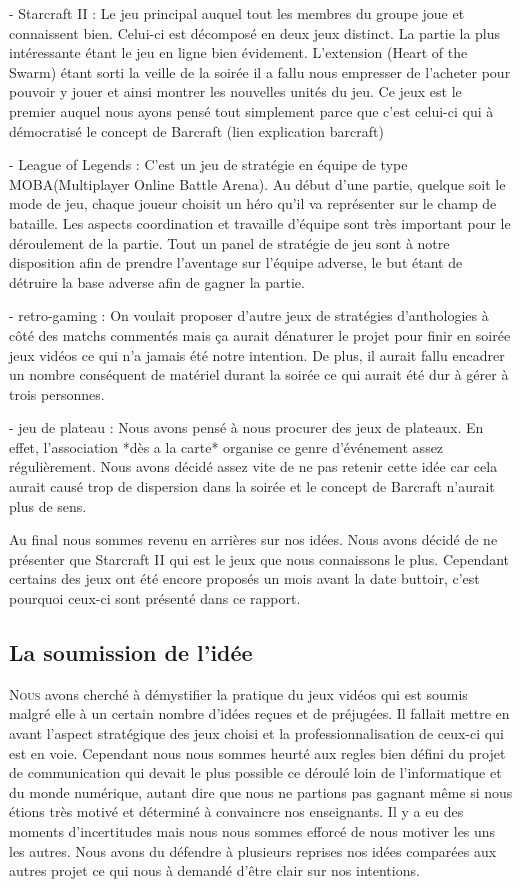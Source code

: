- Starcraft II : Le jeu principal auquel tout les membres du groupe joue
et connaissent bien. Celui-ci est décomposé en deux jeux distinct.  La
partie la plus intéressante étant le jeu en ligne bien évidement.
L'extension (Heart of the Swarm) étant sorti la veille de la soirée il a
fallu nous empresser de l'acheter pour pouvoir y jouer et ainsi montrer
les nouvelles unités du jeu. Ce jeux est le premier auquel nous ayons
pensé tout simplement parce que c'est celui-ci qui à démocratisé le
concept de Barcraft (lien explication barcraft)

- League of Legends : C'est un jeu de stratégie en équipe de type
MOBA(Multiplayer Online Battle Arena). Au début d'une partie, quelque soit
le mode de jeu, chaque joueur choisit un héro qu'il va représenter sur
le champ de bataille. Les aspects coordination et travaille d'équipe sont très
important pour le déroulement de la partie. Tout un panel de stratégie de jeu
sont à notre disposition afin de prendre l'aventage sur l'équipe adverse, le
but étant de détruire la base adverse afin de gagner la partie.

- retro-gaming : On voulait proposer d'autre jeux de stratégies
d'anthologies à côté des matchs commentés mais ça aurait dénaturer le
projet pour finir en soirée jeux vidéos ce qui n'a jamais été notre
intention. De plus, il aurait fallu encadrer un nombre conséquent de
matériel durant la soirée ce qui aurait été dur à gérer à trois
personnes.

- jeu de plateau : Nous avons pensé à nous procurer des jeux de
plateaux. En effet, l'association *dès a la carte* organise ce genre
d'événement assez régulièrement. Nous avons décidé assez vite de ne pas
retenir cette idée car cela aurait causé trop de dispersion dans la
soirée et le concept de Barcraft n'aurait plus de sens.

Au final nous sommes revenu en arrières sur nos idées. Nous avons décidé
de ne présenter que Starcraft II qui est le jeux que nous connaissons le
plus. Cependant certains des jeux ont été encore proposés un mois avant
la date buttoir, c'est pourquoi ceux-ci sont présenté dans ce rapport.


\subsection{La soumission de l'idée}%
\label{sub:la_soumission_de_leidee}

\lettrine{N}{ous} avons cherché à démystifier la pratique du jeux vidéos
qui est soumis malgré elle à un certain nombre d'idées reçues et de
préjugées.  Il fallait mettre en avant l'aspect stratégique des jeux
choisi et la professionnalisation de ceux-ci qui est en voie. Cependant
nous nous sommes heurté aux regles bien défini du projet de
communication qui devait le plus possible ce déroulé loin de
l'informatique et du monde numérique, autant dire que nous ne partions
pas gagnant même si nous étions très motivé et déterminé à convaincre
nos enseignants. Il y a eu des moments d'incertitudes mais nous nous
sommes efforcé de nous motiver les uns les autres. Nous avons du
défendre à plusieurs reprises nos idées comparées aux autres projet ce
qui nous à demandé d'être clair sur nos intentions.

